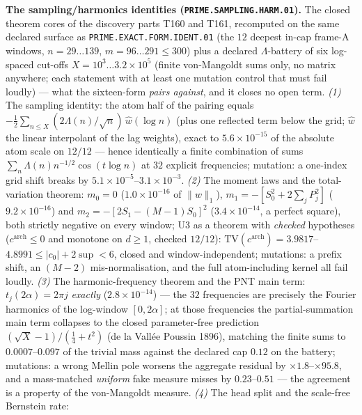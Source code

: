 \par\smallskip\noindent\textbf{The sampling/harmonics identities
(\texttt{PRIME.SAMPLING.HARM.01}).}
The closed theorem cores of the discovery parts T160 and T161,
recomputed on the same declared surface as
\texttt{PRIME.EXACT.FORM.IDENT.01} (the $12$ deepest in-cap frame-A
windows, $n=29\ldots139$, $m=96\ldots291\le300$) plus a declared
$\Lambda$-battery of six log-spaced cut-offs
$X=10^{3}\ldots3.2\times10^{5}$ (finite von-Mangoldt sums only, no
matrix anywhere; each statement with at least one mutation control that
must fail loudly) --- what the sixteen-form \emph{pairs against}, and it
closes no open term. \emph{(1)} The sampling identity: the atom half of
the pairing equals $-\tfrac12\sum_{n\le X}(2\Lambda(n)/\sqrt n)\,
\widehat w(\log n)$ (plus one reflected term below the grid;
$\widehat w$ the linear interpolant of the lag weights), exact to
$5.6\times10^{-15}$ of the absolute atom scale on $12/12$ --- hence
identically a finite combination of sums
$\sum_n\Lambda(n)n^{-1/2}\cos(t\log n)$ at $32$ explicit frequencies;
mutation: a one-index grid shift breaks by
$5.1\times10^{-5}$--$3.1\times10^{-3}$. \emph{(2)} The moment laws and
the total-variation theorem: $m_0=0$ ($1.0\times10^{-16}$ of
$\|w\|_1$), $m_1=-[S_0^2+2\sum_jP_j^2]$ ($9.2\times10^{-16}$) and
$m_2=-[2S_1-(M{-}1)S_0]^2$ ($3.4\times10^{-14}$, a perfect square),
both strictly negative on every window; U3 as a theorem with
\emph{checked} hypotheses ($c^{\mathrm{arch}}\le0$ and monotone on
$d\ge1$, checked $12/12$): $\mathrm{TV}(c^{\mathrm{arch}})=
3.9817$--$4.8991\le|c_0|+2\sup<6$, closed and window-independent;
mutations: a prefix shift, an $(M{-}2)$ mis-normalisation, and the full
atom-including kernel all fail loudly. \emph{(3)} The
harmonic-frequency theorem and the PNT main term:
$t_j(2\alpha)=2\pi j$ \emph{exactly} ($2.8\times10^{-14}$) --- the $32$
frequencies are precisely the Fourier harmonics of the log-window
$[0,2\alpha]$; at those frequencies the partial-summation main term
collapses to the closed parameter-free prediction
$(\sqrt X-1)/(\tfrac14+t^2)$ (de la Vall\'ee Poussin 1896), matching
the finite sums to $0.0007$--$0.097$ of the trivial mass against the
declared cap $0.12$ on the battery; mutations: a wrong Mellin pole
worsens the aggregate residual by $\times1.8$--$\times95.8$, and a
mass-matched \emph{uniform} fake measure misses by $0.23$--$0.51$ ---
the agreement is a property of the von-Mangoldt measure. \emph{(4)} The
head split and the scale-free Bernstein rate:
